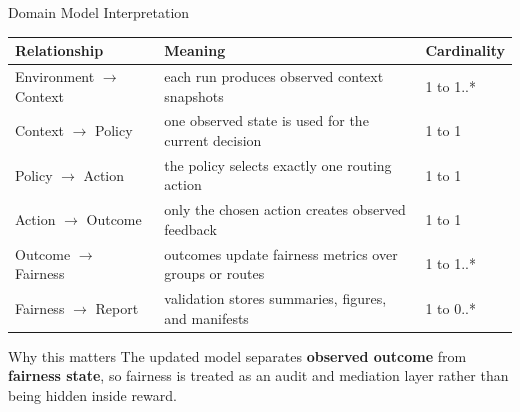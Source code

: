\begin{frame}{Domain Model Interpretation}
\scriptsize
\begin{tabular}{p{}p{}p{}}
\toprule
\textbf{Relationship} & \textbf{Meaning} & \textbf{Cardinality} \\
\midrule
Environment $\rightarrow$ Context & each run produces observed context snapshots & 1 to 1..* \\
Context $\rightarrow$ Policy & one observed state is used for the current decision & 1 to 1 \\
Policy $\rightarrow$ Action & the policy selects exactly one routing action & 1 to 1 \\
Action $\rightarrow$ Outcome & only the chosen action creates observed feedback & 1 to 1 \\
Outcome $\rightarrow$ Fairness & outcomes update fairness metrics over groups or routes & 1 to 1..* \\
Fairness $\rightarrow$ Report & validation stores summaries, figures, and manifests & 1 to 0..* \\
\bottomrule
\end{tabular}

\vspace{0.65em}
\begin{block}{Why this matters}
The updated model separates \textbf{observed outcome} from \textbf{fairness state}, so fairness is treated as an audit and mediation layer rather than being hidden inside reward.
\end{block}
\end{frame}
